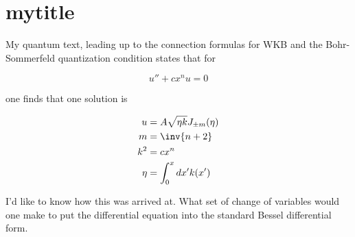 
%

\chapter{mytitle}
\label{chap:template}
{}
\date{Nov XX, 2011}

\beginArtWithToc

%

My quantum text, leading up to the connection formulas for WKB and the Bohr-Sommerfeld quantization condition states that for

\begin{equation*}
u'' + c x^n u = 0 
\end{equation*}

one finds that one solution is

\begin{align*}
u &= A \sqrt{\eta k} J_{\pm m}(\eta) \\
m &= \inv{n + 2} \\
k^2 &= c x^n \\
\eta &= \int_0^x dx' k(x')
\end{align*}

I'd like to know how this was arrived at.  What set of change of variables would one make to put the differential equation into the standard Bessel differential form.

\EndArticle
